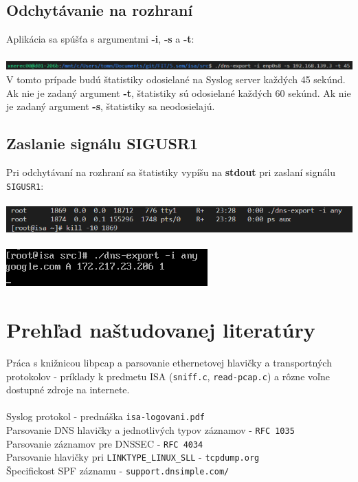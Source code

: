 \documentclass{article}
\begin{document}
        \subsection{Odchytávanie na rozhraní}
        \noindent
        Aplikácia sa spúšťa s argumentmi \textbf{-i}, \textbf{-s} a \textbf{-t}:\\\\
        \includegraphics[scale=0.6]{i1.png}
        V tomto prípade budú štatistiky odosielané na Syslog server každých 45 sekúnd. Ak nie je zadaný argument \textbf{-t},
        štatistiky sú odosielané každých 60 sekúnd. Ak nie je zadaný argument \textbf{-s}, štatistiky sa neodosielajú.

        \subsection{Zaslanie signálu SIGUSR1}
        \noindent
        Pri odchytávaní na rozhraní sa štatistiky vypíšu na \textbf{stdout} pri zaslaní signálu \texttt{SIGUSR1}:\\\\
        \includegraphics[scale=0.6]{i2.png}\\\\
        \includegraphics[scale=0.6]{i3.png}
    
    \newpage
    \section{Prehľad naštudovanej literatúry}
        \noindent
        Práca s knižnicou libpcap a parsovanie ethernetovej hlavičky a transportných protokolov - príklady
        k predmetu ISA (\texttt{sniff.c}, \texttt{read-pcap.c}) a rôzne voľne dostupné zdroje na internete.\\\\
        Syslog protokol - prednáška \texttt{isa-logovani.pdf}\\ 
        Parsovanie DNS hlavičky a jednotlivých typov záznamov - \texttt{RFC 1035}\\
        Parsovanie záznamov pre DNSSEC - \texttt{RFC 4034}\\
        Parsovanie hlavičky pri \texttt{LINKTYPE\_LINUX\_SLL} - \texttt{tcpdump.org}\\
        Špecifickost SPF záznamu - \texttt{support.dnsimple.com/}
    
\end{document}

